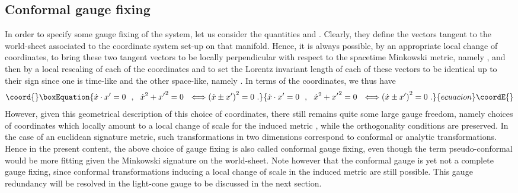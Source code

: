 \documentclass[a4paper,11pt]{article}
\begin{document}
\subsection{Conformal gauge fixing}
\label{Subsect7.2}

In order to specify some gauge fixing of the system, let us consider
the quantities \coordHE{} and \coordHE{}.
Clearly, they define the vectors tangent to the world-sheet associated
to the \myHighlight{$(\tau,\sigma)$}\coordHE{} coordinate system set-up on that manifold.
Hence, it is always possible, by an appropriate local change of coordinates,
to bring these two tangent vectors to be locally perpendicular
with respect to the spacetime Minkowski metric, namely \coordHE{},
and then by a local rescaling of each of the coordinates \myHighlight{$\tau$}\coordHE{} and \myHighlight{$\sigma$}\coordHE{}
to set the Lorentz invariant length of each of these vectors to be identical 
up to their sign since one is time-like and the other space-like, namely
\coordHE{}. In terms of the coordinates, we thus have
\begin{equation}\coord{}\boxEquation{
\dot{x}\cdot x'=0\ \ ,\ \ \dot{x}^2+{x'}^2=0\ \ 
\Longleftrightarrow \left(\dot{x}\pm{x}'\right)^2=0\ .
\label{eq:conformalgaugefixing}
}{
\dot{x}\cdot x'=0\ \ ,\ \ \dot{x}^2+{x'}^2=0\ \ 
\Longleftrightarrow \left(\dot{x}\pm{x}'\right)^2=0\ .
}{ecuacion}\coordE{}\end{equation}
However, given this geometrical description of this choice of coordinates,
there still remains quite some large gauge freedom, namely choices of
coordinates \myHighlight{$\xi^\alpha$}\coordHE{} which locally amount to a local change of scale
for the induced metric \myHighlight{$\gamma_{\alpha\beta}$}\coordHE{},
while the orthogonality conditions are preserved. In the case of an
euclidean signature metric, such transformations in two dimensions
correspond to conformal or analytic transformations. Hence in the
present content, the above choice of gauge fixing is also called conformal 
gauge fixing, even though the term pseudo-conformal would be more fitting
given the Minkowski si\-gna\-tu\-re \myHighlight{$(-+)$}\coordHE{} on the world-sheet. Note however
that the conformal gauge is yet not a complete gauge fixing, since conformal
transformations inducing a local change of scale in the induced metric
\myHighlight{$\gamma_{\alpha\beta}$}\coordHE{} are still possible. This gauge redundancy will
be resolved in the light-cone gauge to be discussed in the next section.
\end{document}
